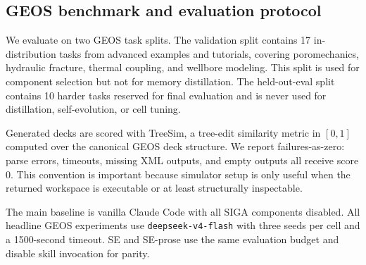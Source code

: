 \documentclass{article}
\begin{document}


\subsection{GEOS benchmark and evaluation protocol}

We evaluate on two GEOS task splits. The validation split contains 17 in-distribution tasks from advanced examples 
and tutorials, covering poromechanics, hydraulic fracture, thermal coupling, and wellbore modeling. This split is used 
for component selection but not for memory distillation. The held-out-eval split contains 10 harder tasks reserved 
for final evaluation and is never used for distillation, self-evolution, or cell tuning.

Generated decks are scored with TreeSim, a tree-edit similarity metric in $[0,1]$ computed over the canonical GEOS 
deck structure. We report failures-as-zero: parse errors, timeouts, missing XML outputs, and empty outputs all receive 
score 0. This convention is important because simulator setup is only useful when the returned workspace is executable 
or at least structurally inspectable.

The main baseline is vanilla Claude Code with all SIGA components disabled. All headline GEOS experiments use 
\texttt{deepseek-v4-flash} with three seeds per cell and a 1500-second timeout. SE and SE-prose use the same evaluation budget 
and disable skill invocation for parity.



\end{document}
